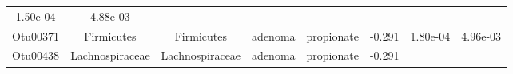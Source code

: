 \documentclass[11pt,]{article}
\begin{document}
\begin{longtable}[]{@{}cccccccc@{}}
\begin{minipage}[t]{0.08\columnwidth}
1.50e-04\strut
\end{minipage} & \begin{minipage}[t]{0.08\columnwidth}\centering\strut
4.88e-03\strut
\end{minipage}\tabularnewline
\begin{minipage}[t]{0.08\columnwidth}\centering\strut
Otu00371\strut
\end{minipage} & \begin{minipage}[t]{0.15\columnwidth}\centering\strut
Firmicutes\strut
\end{minipage} & \begin{minipage}[t]{0.15\columnwidth}\centering\strut
Firmicutes\strut
\end{minipage} & \begin{minipage}[t]{0.08\columnwidth}\centering\strut
adenoma\strut
\end{minipage} & \begin{minipage}[t]{0.09\columnwidth}\centering\strut
propionate\strut
\end{minipage} & \begin{minipage}[t]{0.07\columnwidth}\centering\strut
-0.291\strut
\end{minipage} & \begin{minipage}[t]{0.08\columnwidth}\centering\strut
1.80e-04\strut
\end{minipage} & \begin{minipage}[t]{0.08\columnwidth}\centering\strut
4.96e-03\strut
\end{minipage}\tabularnewline
\begin{minipage}[t]{0.08\columnwidth}\centering\strut
Otu00438\strut
\end{minipage} & \begin{minipage}[t]{0.15\columnwidth}\centering\strut
Lachnospiraceae\strut
\end{minipage} & \begin{minipage}[t]{0.15\columnwidth}\centering\strut
Lachnospiraceae\strut
\end{minipage} & \begin{minipage}[t]{0.08\columnwidth}\centering\strut
adenoma\strut
\end{minipage} & \begin{minipage}[t]{0.09\columnwidth}\centering\strut
propionate\strut
\end{minipage} & \begin{minipage}[t]{0.07\columnwidth}\centering\strut
-0.291\strut
\end{minipage} & \begin{minipage}[t]{0.08\columnwidth}\centering\strut

\end{minipage}
\end{longtable}
\end{document}
